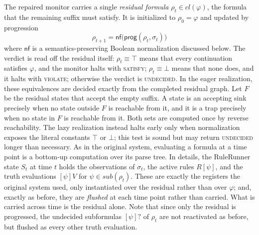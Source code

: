 The repaired monitor carries a single \emph{residual formula} $\rho_t \in cl(\varphi)$, the formula that the remaining suffix must satisfy. It is initialized to $\rho_0 = \varphi$ and updated by progression
\[
    \rho_{t+1} = \mathsf{nf}\bigl(\mathsf{prog}(\rho_t,\sigma_t)\bigr)
\]
where $\mathsf{nf}$ is a semantics-preserving Boolean normalization discussed below. The verdict is read off the residual itself: $\rho_t \equiv \top$ means that every continuation satisfies $\varphi$, and the monitor halts with \textsc{satisfy}; $\rho_t \equiv \bot$ means that none does, and it halts with \textsc{violate}; otherwise the verdict is \textsc{undecided}.
%
In the eager realization, these equivalences are decided exactly from the
completed residual graph.  Let $F$ be the residual states that accept the empty
suffix.  A state is an accepting sink precisely when no state outside $F$ is
reachable from it, and it is a trap precisely when no state in $F$ is
reachable from it.  Both sets are computed once by reverse reachability.  The
lazy realization instead halts early only when normalization exposes the
literal constants $\top$ or $\bot$; this test is sound but may return
\textsc{undecided} longer than necessary.
%
As in the original system, evaluating a formula at a time point is a bottom-up computation over its parse tree. In details, the RuleRunner state $S_t$ at time $t$ holds the observations of $\sigma_t$, the active rules $R[\psi]$, and the truth evaluations $[\psi]V$ for $\psi\in sub(\rho_t)$. 
These are exactly the registers the original system used, only instantiated over the residual rather than over $\varphi$; and, exactly as before, they are \emph{flushed} at each time point rather than carried. What is carried across time is the residual alone. 
Note that since only the residual is progressed, the undecided subformulas $[\psi]?$ of $\rho_t$ are not reactivated as before, but flushed as every other truth evaluation.

